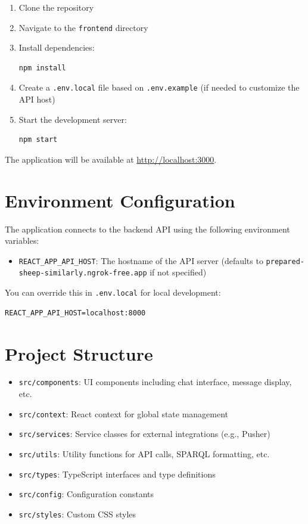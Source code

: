 \begin{enumerate}
    \item Clone the repository
    \item Navigate to the \texttt{frontend} directory
    \item Install dependencies:
    \begin{lstlisting}[language=bash]
npm install
    \end{lstlisting}
    \item Create a \texttt{.env.local} file based on \texttt{.env.example} (if needed to customize the API host)
    \item Start the development server:
    \begin{lstlisting}[language=bash]
npm start
    \end{lstlisting}
\end{enumerate}

The application will be available at \url{http://localhost:3000}.

\section*{Environment Configuration}

The application connects to the backend API using the following environment variables:

\begin{itemize}
    \item \texttt{REACT\_APP\_API\_HOST}: The hostname of the API server (defaults to \texttt{prepared-sheep-similarly.ngrok-free.app} if not specified)
\end{itemize}

You can override this in \texttt{.env.local} for local development:

\begin{lstlisting}
REACT_APP_API_HOST=localhost:8000
\end{lstlisting}

\section*{Project Structure}

\begin{itemize}
    \item \texttt{src/components}: UI components including chat interface, message display, etc.
    \item \texttt{src/context}: React context for global state management
    \item \texttt{src/services}: Service classes for external integrations (e.g., Pusher)
    \item \texttt{src/utils}: Utility functions for API calls, SPARQL formatting, etc.
    \item \texttt{src/types}: TypeScript interfaces and type definitions
    \item \texttt{src/config}: Configuration constants
    \item \texttt{src/styles}: Custom CSS styles
\end{itemize}

